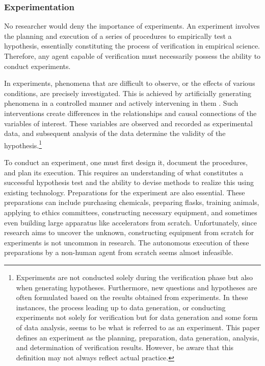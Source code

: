 
\subsubsection{Experimentation}
\label{section-experimentation}
No researcher would deny the importance of experiments. An experiment involves the planning and execution of a series of procedures to empirically test a hypothesis, essentially constituting the process of verification in empirical science. Therefore, any agent capable of verification must necessarily possess the ability to conduct experiments.

In experiments, phenomena that are difficult to observe, or the effects of various conditions, are precisely investigated. This is achieved by artificially generating phenomena in a controlled manner and actively intervening in them \cite{radder2009philosophy}. Such interventions create differences in the relationships and causal connections of the variables of interest. These variables are observed and recorded as experimental data, and subsequent analysis of the data determine the validity of the hypothesis.\footnote{
Experiments are not conducted solely during the verification phase but also when generating hypotheses. Furthermore, new questions and hypotheses are often formulated based on the results obtained from experiments. In these instances, the process leading up to data generation, or conducting experiments not solely for verification but for data generation and some form of data analysis, seems to be what is referred to as an experiment. This paper defines an experiment as the planning, preparation, data generation, analysis, and determination of verification results. However, be aware that this definition may not always reflect actual practice.
}

To conduct an experiment, one must first design it, document the procedures, and plan its execution. This requires an understanding of what constitutes a successful hypothesis test and the ability to devise methods to realize this using existing technology. Preparations for the experiment are also essential. These preparations can include purchasing chemicals, preparing flasks, training animals, applying to ethics committees, constructing necessary equipment, and sometimes even building large apparatus like accelerators from scratch. Unfortunately, since research aims to uncover the unknown, constructing equipment from scratch for experiments is not uncommon in research. The autonomous execution of these preparations by a non-human agent from scratch seems almost infeasible.

